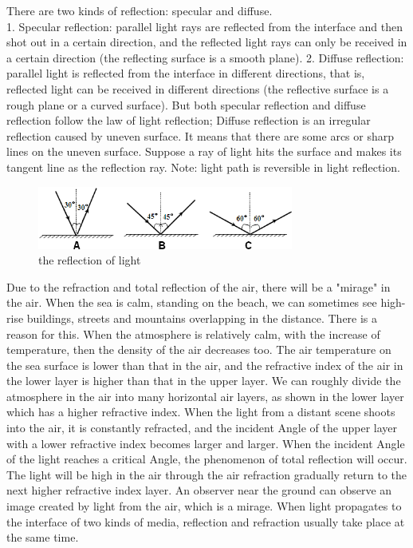 \documentclass[a4paper]{article}
\begin{document}
There are two kinds of reflection: specular and diffuse.\\

1. Specular reflection: parallel light rays are reflected from the interface and then shot out in a certain direction, and the reflected light rays can only be received in a certain direction (the reflecting surface is a smooth plane).
2. Diffuse reflection: parallel light is reflected from the interface in different directions, that is, reflected light can be received in different directions (the reflective surface is a rough plane or a curved surface).
But both specular reflection and diffuse reflection follow the law of light reflection; Diffuse reflection is an irregular reflection caused by uneven surface. It means that there are some arcs or sharp lines on the uneven surface. Suppose a ray of light hits the surface and makes its tangent line as the reflection ray.
Note: light path is reversible in light reflection.
\\

\begin{figure}
	\includegraphics[width=0.75\textwidth]{5.png}
		\caption{the reflection of light}
\end{figure}
Due to the refraction and total reflection of the air, there will be a "mirage" in the air. When the sea is calm, standing on the beach, we can sometimes see high-rise buildings, streets and mountains overlapping in the distance. \cite{cJ. Geisler} There is a reason for this. When the atmosphere is relatively calm, with the increase of temperature, then the density of the air decreases too. The air temperature on the sea surface is lower than that in the air, and the refractive index of the air in the lower layer is higher than that in the upper layer. We can roughly divide the atmosphere in the air into many horizontal air layers, as shown in the lower layer which has a higher refractive index. When the light from a distant scene shoots into the air, it is constantly refracted, and the incident Angle of the upper layer with a lower refractive index becomes larger and larger. When the incident Angle of the light reaches a critical Angle, the phenomenon of total reflection will occur. The light will be high in the air through the air refraction gradually return to the next higher refractive index layer. An observer near the ground can observe an image created by light from the air, which is a mirage. When light propagates to the interface of two kinds of media, reflection and refraction usually take place at the same time. 
\end{document}
